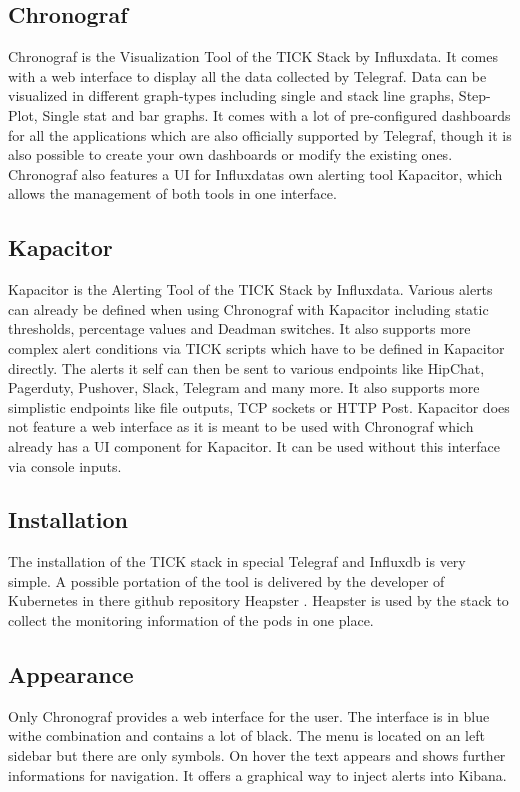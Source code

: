 \subsection{Chronograf}
Chronograf is the Visualization Tool of the TICK Stack by Influxdata. It comes with a web interface to display all the data collected by Telegraf. Data can be visualized in different graph-types including single and stack line graphs, Step-Plot, Single stat and bar graphs. It comes with a lot of pre-configured dashboards for all the applications which are also officially supported by Telegraf, though it is also possible to create your own dashboards or modify the existing ones. 
Chronograf also features a UI for Influxdatas own alerting tool Kapacitor, which allows the management of both tools in one interface.
\subsection{Kapacitor}
Kapacitor is the Alerting Tool of the TICK Stack by Influxdata. Various alerts can already be defined when using Chronograf with Kapacitor including static thresholds, percentage values and Deadman switches. It also supports more complex alert conditions via TICK scripts which have to be defined in Kapacitor directly.
The alerts it self can then be sent to various endpoints like HipChat, Pagerduty, Pushover, Slack, Telegram and many more. It also supports more simplistic endpoints like file outputs, TCP sockets or HTTP Post.
Kapacitor does not feature a web interface as it is meant to be used with Chronograf which already has a UI component for Kapacitor. It can be used without this interface via console inputs.
\subsection{Installation}
The installation of the TICK stack in special Telegraf and Influxdb is very simple. A possible portation of the tool is delivered by the developer of Kubernetes in there github repository Heapster \cite{heapster}. Heapster is used by the stack to collect the monitoring information of the pods in one place.
\subsection{Appearance}
Only Chronograf provides a web interface for the user. The interface is in blue withe combination and contains a lot of black. The menu is located on an left sidebar but there are only symbols. On hover the text appears and shows further informations for navigation. It offers a graphical way to inject alerts into Kibana.

